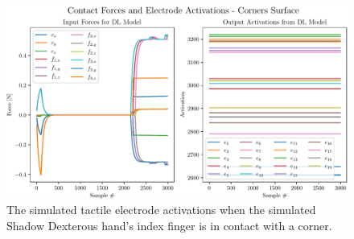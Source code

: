 \begin{figure}[h]
	\begin{center}
		\includegraphics[width=\textwidth]{chapters/1-tactile-perception/fig/corners-contact-graph.pdf}
	\end{center}
	\caption{The simulated tactile electrode activations when the simulated Shadow Dexterous hand's index finger is in contact with a corner.}
	\label{app:corner-contact-graph}
\end{figure}